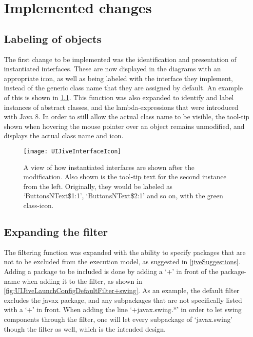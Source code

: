 \chapter{Implemented changes}\label{jiveImpl}%

\section{Labeling of objects}\label{implLabel}

The first change to be implemented was the identification and presentation of instantiated interfaces.
These are now displayed in the diagrams with an appropriate icon, as well as being labeled with the interface they implement, instead of the generic class name that they are assigned by default.
An example of this is shown in \cref{fig:JiveNewIcon}.
This function was also expanded to identify and label instances of abstract classes, and the lambda-expressions that were introduced with Java 8.
In order to still allow the actual class name to be visible, the tool-tip shown when hovering the mouse pointer over an object remains unmodified, and displays the actual class name and icon.
\begin{figure}[H]
	\centering
	\texttt{[image: UIJiveInterfaceIcon]}
	\caption[A view of how instantiated interfaces are shown after the modification.]{A view of how instantiated interfaces are shown after the modification. Also shown is the tool-tip text for the second instance from the left. Originally, they would be labeled as `ButtonsNText\$1:1', `ButtonsNText\$2:1' and so on, with the green class-icon.}
	\label{fig:JiveNewIcon}
\end{figure}

\section{Expanding the filter}\label{implFilter}

The filtering function was expanded with the ability to specify packages that are not to be excluded from the execution model, as suggested in \cref{jiveSuggestions}.
Adding a package to be included is done by adding a `+' in front of the package-name when adding it to the filter, as shown in  \cref{fig:UIJiveLaunchConfigDefaultFilter+swing}.
As an example, the default filter excludes the javax package, and any subpackages that are not specifically listed with a `+' in front.
When adding the line `+javax.swing.*' in order to let swing components through the filter, one will let every subpackage of `javax.swing' though the filter as well, which is the intended design.

